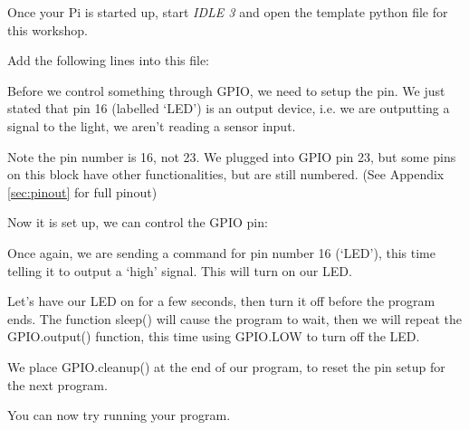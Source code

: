 			Once your Pi is started up, start \textit{IDLE 3} and open the template python file for this workshop.
		
			
			
			Add the following lines into this file:
			
			
			
			Before we control something through GPIO, we need to setup the pin. We just stated that pin 16 (labelled `LED') is an output device, i.e. we are outputting a signal to the light, we aren't reading a sensor input.
			
			Note the pin number is 16, not 23. We plugged into GPIO pin 23, but some pins on this block have other functionalities, but are still numbered. (See Appendix \ref{sec:pinout} for full pinout)
			
			Now it is set up, we can control the GPIO pin:
			
			
			
			Once again, we are sending a command for pin number 16 (`LED'), this time telling it to output a `high' signal. This will turn on our LED.
			
			Let's have our LED on for a few seconds, then turn it off before the program ends. The function sleep() will cause the program to wait, then we will repeat the GPIO.output() function, this time using GPIO.LOW to turn off the LED.
			
			
			
			We place GPIO.cleanup() at the end of our program, to reset the pin setup for the next program.
			
			You can now try running your program.
		
